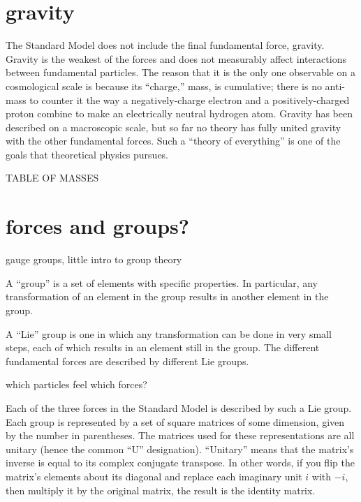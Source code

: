 \section{gravity}
The Standard Model does not include the final 
fundamental force, gravity.  
Gravity is the weakest of the forces and does not 
measurably affect interactions between fundamental particles.  
The reason that it is the only one observable on a 
cosmological scale is because its ``charge,'' mass, 
is cumulative; there is no anti-mass to counter it 
the way a negatively-charge electron and a positively-charged 
proton combine to make an electrically neutral hydrogen atom.  %
Gravity has been described on a macroscopic scale, but 
so far no theory has fully united gravity with the 
other fundamental forces.  
Such a ``theory of everything'' is 
one of the goals that 
theoretical physics %
pursues.  


TABLE OF MASSES




\section{forces and groups?}

gauge groups, little intro to group theory

A ``group'' is a set of elements with specific properties.  
In particular, any transformation of an element in the group 
results in another element in the group.  

A ``Lie'' group is one in which any transformation %
can be done in very small steps, 
each of which results in an element still in the group.  
The different fundamental forces are described by different Lie groups.  

which particles feel which forces?

Each of the three forces in the Standard Model 
is described by such a Lie group.  %
Each group is represented by a set of square matrices 
of some dimension, given by the number in parentheses.  
The matrices used for these representations are 
all unitary (hence the common ``U'' designation).  
``Unitary'' means that the matrix's inverse 
is equal to its complex conjugate transpose.  
In other words, if you flip the matrix's elements 
about its diagonal and replace each imaginary unit $i$ 
with $-i$, then multiply it by the original matrix, 
the result is the identity matrix.   %

